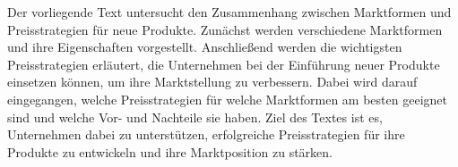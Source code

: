 \begin{refsection}
  

  Der vorliegende Text untersucht den Zusammenhang zwischen Marktformen und Preisstrategien für neue Produkte. Zunächst werden verschiedene Marktformen und ihre Eigenschaften vorgestellt. Anschließend werden die wichtigsten Preisstrategien erläutert, die Unternehmen bei der Einführung neuer Produkte einsetzen können, um ihre Marktstellung zu verbessern. Dabei wird darauf eingegangen, welche Preisstrategien für welche Marktformen am besten geeignet sind und welche Vor- und Nachteile sie haben. Ziel des Textes ist es, Unternehmen dabei zu unterstützen, erfolgreiche Preisstrategien für ihre Produkte zu entwickeln und ihre Marktposition zu stärken.


  \clearpage
  \printbibliography[heading=subsubbibliography]
\end{refsection}
\clearpage
